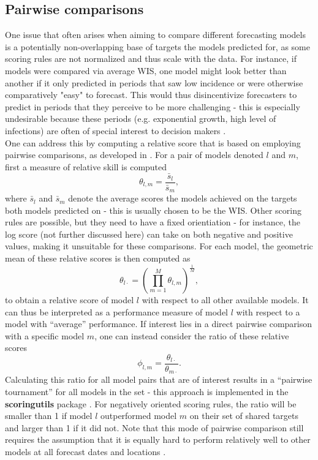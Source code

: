\subsection{Pairwise comparisons}
One issue that often arises when aiming to compare different forecasting models is a potentially non-overlapping base of targets the models predicted for, as some scoring rules are not normalized and thus scale with the data. For instance, if models were compared via average WIS, one model might look better than another if it only predicted in periods that saw low incidence or were otherwise comparatively "easy" to forecast. This would thus disincentivize forecasters to predict in periods that they perceive to be more challenging - this is especially undesirable because these periods (e.g. exponential growth, high level of infections) are often of special interest to decision makers .\\
One can address this by computing a relative score that is based on employing pairwise comparisons, as developed in \cite{cramer_evaluation_2022}. For a pair of models denoted $l$ and $m$, first a measure of relative skill is computed
\[
\theta_{l,m} = \frac{\bar{s}_{l}}{\bar{s}_{m}},
\]
where $\bar{s}_{l}$ and $\bar{s}_{m}$ denote the average scores the models achieved on the targets both models predicted on - this is usually chosen to be the WIS. Other scoring rules are possible, but they need to have a fixed orientiation - for instance, the log score (not further discussed here) can take on both negative and positive values, making it unsuitable for these comparisons. For each model, the geometric mean of these relative scores is then computed as
\[
\theta_{l\cdot} = \left(\prod_{m = 1}^{M}\theta_{l,m} \right)^{\frac{1}{M}},
\]to obtain a relative score of model $l$ with respect to all other available models. It can thus be interpreted as a performance measure of model $l$ with respect to a model with ``average'' performance. If interest lies in a direct pairwise comparison with a specific model $m$, one can instead consider the ratio of these relative scores
\[
\phi_{l,m} = \frac{\theta_{l\cdot}}{\theta_{m\cdot}}.
\]
Calculating this ratio for all model pairs that are of interest results in a ``pairwise tournament'' for all models in the set - this approach is implemented in the \textbf{scoringutils} package \citep{bosse_epiforecastsscoringutils_2022}. For negatively oriented scoring rules, the ratio will be smaller than 1 if model $l$ outperformed model $m$ on their set of shared targets and larger than 1 if it did not. Note that this mode of pairwise comparison still requires the assumption that it is equally hard to perform relatively well to other models at all forecast dates and locations \citep{cramer_evaluation_2022}.\\
